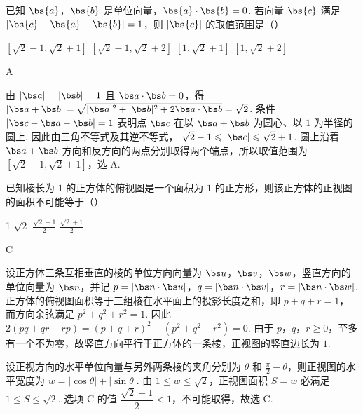 \begin{problem}
已知 \(\bs{a}\)，\(\bs{b}\) 是单位向量，\(\bs{a} \cdot \bs{b} = 0\). 若向量 \(\bs{c}\) 满足 \(\left|\bs{c} - \bs{a} - \bs{b}\right| = 1\)，则 \(\left|\bs{c}\right|\) 的取值范围是（\quad）

\choices
    {\(\left[\sqrt{2} - 1, \sqrt{2} + 1\right]\)}
    {\(\left[\sqrt{2} - 1, \sqrt{2} + 2\right]\)}
    {\([1, \sqrt{2} + 1]\)}
    {\([1, \sqrt{2} + 2]\)}
\end{problem}

\begin{answer}
A
\end{answer}

\begin{solution}
由 \(|\bs a|=|\bs b|=1\) 且 \(\bs a\cdot\bs b=0\)，得
\(|\bs a+\bs b|=\sqrt{|\bs a|^{2}+|\bs b|^{2}+2\bs a\cdot\bs b}=\sqrt{2}\).
条件 \(|\bs c-\bs a-\bs b|=1\) 表明点 \(\bs c\) 在以 \(\bs a+\bs b\) 为圆心、以 \(1\) 为半径的圆上. 因此由三角不等式及其逆不等式，
\(\sqrt{2}-1\leqslant|\bs c|\leqslant\sqrt{2}+1\).
圆上沿着 \(\bs a+\bs b\) 方向和反方向的两点分别取得两个端点，所以取值范围为 \([\sqrt{2}-1,\sqrt{2}+1]\)，选 A.
\end{solution}

\begin{problem}
已知棱长为 \(1\) 的正方体的俯视图是一个面积为 \(1\) 的正方形，则该正方体的正视图的面积不可能等于（\quad）

\choices
    {1}
    {\(\sqrt{2}\)}
    {\(\frac{\sqrt{2} - 1}{2}\)}
    {\(\frac{\sqrt{2} + 1}{2}\)}
\end{problem}

\begin{answer}
C
\end{answer}

\begin{solution}
设正方体三条互相垂直的棱的单位方向向量为 \(\bs u\)，\(\bs v\)，\(\bs w\)，竖直方向的单位向量为 \(\bs n\)，并记
\(p=|\bs n\cdot\bs u|\)，\(q=|\bs n\cdot\bs v|\)，\(r=|\bs n\cdot\bs w|\). 正方体的俯视图面积等于三组棱在水平面上的投影长度之和，即
\(p+q+r=1\)，而方向余弦满足 \(p^{2}+q^{2}+r^{2}=1\). 因此
\(2(pq+qr+rp)=(p+q+r)^{2}-(p^{2}+q^{2}+r^{2})=0\). 由于 \(p\)，\(q\)，\(r\geqslant0\)，至多有一个不为零，故竖直方向平行于正方体的一条棱，正视图的竖直边长为 \(1\).

设正视方向的水平单位向量与另外两条棱的夹角分别为 \(\theta\) 和 \(\frac{\pi}{2}-\theta\)，则正视图的水平宽度为
\(w=|\cos\theta|+|\sin\theta|\). 由
\(1\leqslant w\leqslant\sqrt{2}\)，正视图面积 \(S=w\) 必满足 \(1\leqslant S\leqslant\sqrt{2}\). 选项 C 的值 \(\dfrac{\sqrt{2}-1}{2}<1\)，不可能取得，故选 C.
\end{solution}

